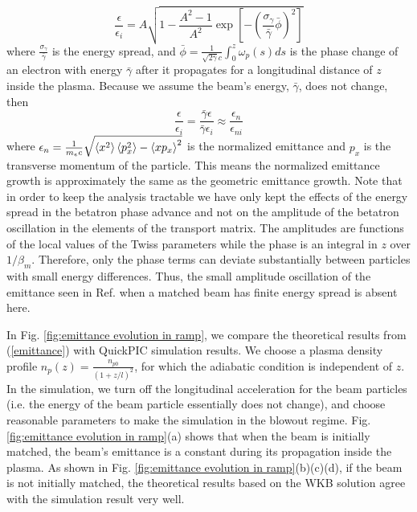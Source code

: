 \documentclass[%
reprint, superscriptaddress,
 amsmath,amssymb, aps,
prstab,
]{revtex4-2}
\begin{document}
\begin{equation} \frac{\epsilon}{\epsilon_i}=A\sqrt{ 1-\frac{A^2
-1}{A^2} \exp[-(\frac{\sigma_\gamma}{\bar \gamma}\bar \phi)^2]}  
\label{emittance} \end{equation} where $\frac{\sigma_\gamma}{\bar
\gamma}$ is the energy spread, and $\bar \phi = \frac{1}{\sqrt{2 \bar
\gamma}c}\int_0^z \omega_p(s) ds$ is the phase change of an electron with energy $\bar \gamma$ after it
propagates for a longitudinal distance of $z$ inside the plasma. Because we assume the beam's energy, $\bar \gamma$, does not change, then 
\[
\frac{\epsilon}{\epsilon_i}= \frac{\bar \gamma \epsilon}{\bar \gamma \epsilon_i} \approx \frac{\epsilon_n}{\epsilon_{ni}}
\]
where $\epsilon_n = \frac{1}{m_ec} \sqrt{\braket{x^2}\braket{p_x^2}-\braket{xp_x}^2 }$
is the normalized emittance and $p_x$ is the transverse momentum of the particle. This means the normalized emittance growth is approximately the same as the geometric emittance growth. Note that in order to keep the analysis tractable we have only kept the effects of the energy spread in the betatron phase advance and not on the amplitude of the betatron oscillation in the elements of the transport matrix. The amplitudes are functions of the local values of the Twiss parameters while the phase is an integral in $z$ over $1/\beta_m$. Therefore, only the phase terms can deviate substantially between particles with small energy differences.  Thus, the small amplitude oscillation of the emittance seen in Ref. \cite{Robert} when a matched beam has finite energy spread is absent here.

In Fig. \ref{fig:emittance evolution in ramp}, we compare the
theoretical results from (\ref{emittance}) with QuickPIC \cite{QuickPIC2006,QuickPIC2013}  simulation results. We choose a plasma
density profile $n_p(z) = \frac{n_{p0}}{(1+z/l)^2}$, for which the adiabatic condition is independent of $z$. In the
simulation, we turn off the longitudinal acceleration for the beam
particles (i.e. the energy of the beam particle essentially does not change), and
choose reasonable parameters to make the simulation in the blowout
regime. Fig. \ref{fig:emittance evolution in ramp}(a) shows that when the
beam is initially matched, the beam's emittance is a constant during its
propagation inside the plasma. As shown in Fig. \ref{fig:emittance evolution in ramp}(b)(c)(d), if the beam is not initially matched, the
theoretical results based on the WKB solution agree with the
simulation result very well.
\end{document}
